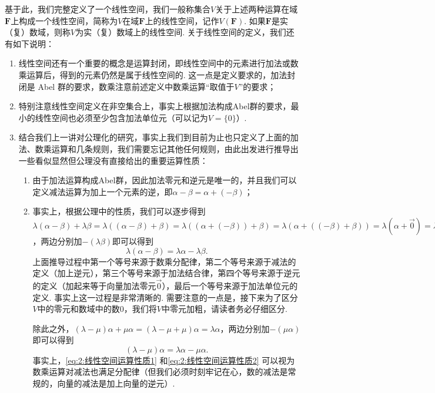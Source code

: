 基于此，我们完整定义了一个线性空间，我们一般称集合$V$关于上述两种运算在域$\mathbf{F}$上构成一个线性空间，简称为$V$在域$\mathbf{F}$上的线性空间，记作$V(\mathbf{F})$. 如果$\mathbf{F}$是实（复）数域，则称$V$为实（复）数域上的线性空间. 关于线性空间的定义，我们还有如下说明：
\begin{enumerate}
    \item 线性空间还有一个重要的概念是运算封闭，即线性空间中的元素进行加法或数乘运算后，得到的元素仍然是属于线性空间的. 这一点是定义要求的，加法封闭是 Abel 群的要求，数乘注意前述定义中数乘运算``取值于$V$''的要求；

    \item 特别注意线性空间定义在非空集合上，事实上根据加法构成Abel群的要求，最小的线性空间也必须至少包含加法单位元（可以记为$V=\{0\}$）.

    \item 结合我们上一讲对公理化的研究，事实上我们到目前为止也只定义了上面的加法、数乘运算和几条规则，我们需要忘记其他任何规则，由此出发进行推导出一些看似显然但公理没有直接给出的重要运算性质：
    \begin{enumerate}
        \item 由于加法运算构成Abel群，因此加法零元和逆元是唯一的，并且我们可以定义减法运算为加上一个元素的逆，即$\alpha-\beta=\alpha+(-\beta)$；

        \item 事实上，根据公理中的性质，我们可以逐步得到$\lambda(\alpha-\beta)+\lambda\beta=\lambda((\alpha-\beta)+\beta)=\lambda((\alpha+(-\beta))+\beta)=\lambda(\alpha+((-\beta)+\beta))=\lambda(\alpha+\vec{0})=\lambda\alpha$，两边分别加$-(\lambda\beta)$即可以得到
        \begin{equation}\label{eq:2:线性空间运算性质1}
            \lambda(\alpha-\beta)=\lambda\alpha-\lambda\beta.
        \end{equation}
        上面推导过程中第一个等号来源于数乘分配律，第二个等号来源于减法的定义（加上逆元），第三个等号来源于加法结合律，第四个等号来源于逆元的定义（加起来等于向量加法零元$\vec{0}$），最后一个等号来源于加法单位元的定义. 事实上这一过程是非常清晰的. 需要注意的一点是，接下来为了区分$V$中的零元和数域中的数0，我们将$V$中零元加粗，请读者务必仔细区分.

        除此之外，$(\lambda-\mu)\alpha+\mu\alpha=(\lambda-\mu+\mu)\alpha=\lambda\alpha$，两边分别加$-(\mu\alpha)$即可以得到
        \begin{equation}\label{eq:2:线性空间运算性质2}
            (\lambda-\mu)\alpha=\lambda\alpha-\mu\alpha.
        \end{equation}
        事实上，\autoref{eq:2:线性空间运算性质1} 和\autoref{eq:2:线性空间运算性质2} 可以视为数乘运算对减法也满足分配律（但我们必须时刻牢记在心，数的减法是常规的，向量的减法是加上向量的逆元）.


\end{enumerate}
\end{enumerate}
